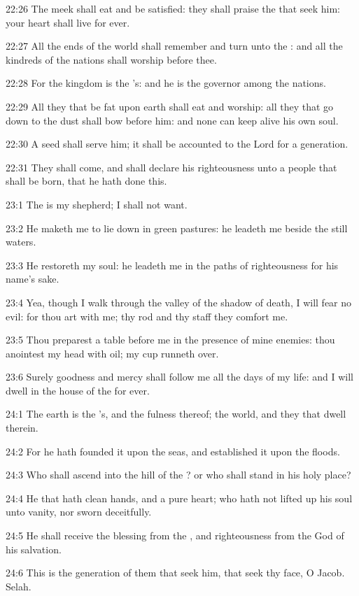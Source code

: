 22:26 The meek shall eat and be satisfied: they shall praise the \LORD that seek him: your heart shall live for ever.

22:27 All the ends of the world shall remember and turn unto the \LORD: and all the kindreds of the nations shall worship before thee.

22:28 For the kingdom is the \LORD's: and he is the governor among the nations.

22:29 All they that be fat upon earth shall eat and worship: all they that go down to the dust shall bow before him: and none can keep alive his own soul.

22:30 A seed shall serve him; it shall be accounted to the Lord for a generation.

22:31 They shall come, and shall declare his righteousness unto a people that shall be born, that he hath done this.



23:1 The \LORD is my shepherd; I shall not want.

23:2 He maketh me to lie down in green pastures: he leadeth me beside the still waters.

23:3 He restoreth my soul: he leadeth me in the paths of righteousness for his name's sake.

23:4 Yea, though I walk through the valley of the shadow of death, I will fear no evil: for thou art with me; thy rod and thy staff they comfort me.

23:5 Thou preparest a table before me in the presence of mine enemies: thou anointest my head with oil; my cup runneth over.

23:6 Surely goodness and mercy shall follow me all the days of my life: and I will dwell in the house of the \LORD for ever.



24:1 The earth is the \LORD's, and the fulness thereof; the world, and they that dwell therein.

24:2 For he hath founded it upon the seas, and established it upon the floods.

24:3 Who shall ascend into the hill of the \LORD? or who shall stand in his holy place?

24:4 He that hath clean hands, and a pure heart; who hath not lifted up his soul unto vanity, nor sworn deceitfully.

24:5 He shall receive the blessing from the \LORD, and righteousness from the God of his salvation.

24:6 This is the generation of them that seek him, that seek thy face, O Jacob. Selah.

